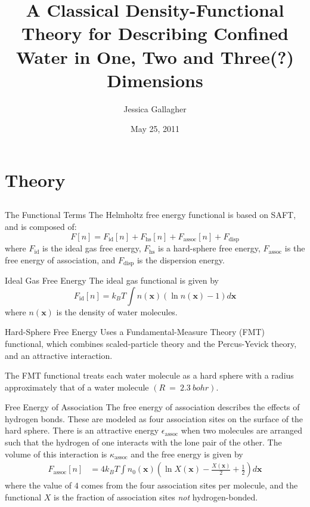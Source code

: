 \documentclass{beamer}
\title{A Classical Density-Functional Theory for Describing Confined Water in One, Two and Three(?) Dimensions}
\author{Jessica Gallagher}
\date{May 25, 2011}
\begin{document}
\begin{frame}
  \titlepage
\end{frame}

\section{Theory}
\subsection*{}

\begin{frame}[fragile]{The Functional Terms}
The Helmholtz free energy functional is
based on SAFT, and is composed of:
\begin{equation}
  F[n] = F_\text{id}[n] + F_\text{hs}[n] + F_\text{assoc}[n] + F_\text{disp}
\end{equation}
where $F_\text{id}$ is the ideal gas free energy, $F_\text{hs}$ is
a hard-sphere free energy, $F_\text{assoc}$ is the free energy of
association, and $F_\text{disp}$ is the dispersion energy. 
\end{frame}

\begin{frame}[fragile]{Ideal Gas Free Energy}
The ideal gas functional is given by
\begin{equation}
  F_\text{id}[n] = k_B T \int n(\textbf{x})\left( \ln{n(\textbf{x})} - 1\right) d\textbf{x}
\end{equation}
where $n(\textbf{x})$ is the density of water molecules.  
\end{frame}

\begin{frame}[fragile]{Hard-Sphere Free Energy}
Uses a Fundamental\nobreakdash-Measure Theory (FMT) functional,
which combines scaled-particle theory and the Percus-Yevick theory,
and an attractive interaction.  

The FMT functional treats
each water molecule as a hard sphere with a radius approximately that of
a water molecule $(R~=~2.3~bohr)$.
\end{frame}
 
\begin{frame}[fragile]{Free Energy of Association}
The free energy of association describes the effects of hydrogen bonds. These are modeled as
four association sites on the surface of the
hard sphere. There is an attractive energy
$\epsilon_\text{assoc}$ when two molecules are arranged such that
the hydrogen of one interacts with the lone pair of the other.  The
volume of this interaction is $\kappa_\text{assoc}$ and the free energy is given by
\begin{align}
  F_\text{assoc}[n] &= 4 k_BT \int n_0(\textbf{x})
  \left(\ln X(\textbf{x}) - \frac{X(\textbf{x})}{2} + \frac12\right) d\textbf{x}
\end{align}
where the value of $4$ comes from the four association sites per
molecule, and the functional $X$ is the fraction of association sites
\emph{not} hydrogen-bonded. 
\end{frame}
 
\end{document}
